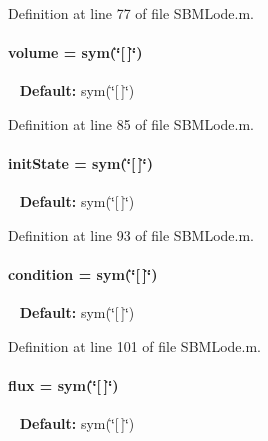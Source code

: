 Definition at line 77 of file S\+B\+M\+Lode.\+m.

\hypertarget{class_s_b_m_lode_a9bc498ccac8db41438f855f5dd3f4c05}{}
\paragraph[{volume}]{\setlength{\rightskip}{0pt plus 5cm}volume = sym(\char`\"{}\mbox{[}$\,$\mbox{]}\char`\"{})}\label{class_s_b_m_lode_a9bc498ccac8db41438f855f5dd3f4c05}
~\newline
{\bfseries Default\+:} sym(\char`\"{}\mbox{[}$\,$\mbox{]}\char`\"{}) 

Definition at line 85 of file S\+B\+M\+Lode.\+m.

\hypertarget{class_s_b_m_lode_a67d068407e71cba6ca16f3f6b6d1794c}{}
\paragraph[{init\+State}]{\setlength{\rightskip}{0pt plus 5cm}init\+State = sym(\char`\"{}\mbox{[}$\,$\mbox{]}\char`\"{})}\label{class_s_b_m_lode_a67d068407e71cba6ca16f3f6b6d1794c}
~\newline
{\bfseries Default\+:} sym(\char`\"{}\mbox{[}$\,$\mbox{]}\char`\"{}) 

Definition at line 93 of file S\+B\+M\+Lode.\+m.

\hypertarget{class_s_b_m_lode_a4824b91cc0e6b5f112bdd8049af4d7d6}{}
\paragraph[{condition}]{\setlength{\rightskip}{0pt plus 5cm}condition = sym(\char`\"{}\mbox{[}$\,$\mbox{]}\char`\"{})}\label{class_s_b_m_lode_a4824b91cc0e6b5f112bdd8049af4d7d6}
~\newline
{\bfseries Default\+:} sym(\char`\"{}\mbox{[}$\,$\mbox{]}\char`\"{}) 

Definition at line 101 of file S\+B\+M\+Lode.\+m.

\hypertarget{class_s_b_m_lode_a96d7a28b6a4428be15fc1017d19343fa}{}
\paragraph[{flux}]{\setlength{\rightskip}{0pt plus 5cm}flux = sym(\char`\"{}\mbox{[}$\,$\mbox{]}\char`\"{})}\label{class_s_b_m_lode_a96d7a28b6a4428be15fc1017d19343fa}
~\newline
{\bfseries Default\+:} sym(\char`\"{}\mbox{[}$\,$\mbox{]}\char`\"{}) 

